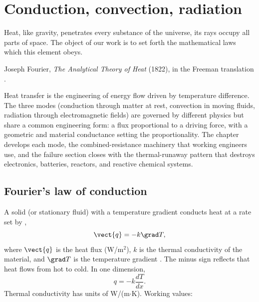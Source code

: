 \chapter{Conduction, convection, radiation}
\label{vol04:ch05}

\epigraph{Heat, like gravity, penetrates every substance of the
universe, its rays occupy all parts of space. The object of our work
is to set forth the mathematical laws which this element obeys.}{
Joseph Fourier, \emph{The Analytical Theory of Heat} (1822), in the
Freeman translation \cite[Preliminary Discourse, p.~1]{hist:fourier1822}.}


\noindent
Heat transfer is the engineering of energy flow driven by temperature
difference. The three modes (conduction through matter at rest,
convection in moving fluids, radiation through electromagnetic
fields) are governed by different physics but share a common
engineering form: a flux proportional to a driving force, with a
geometric and material conductance setting the proportionality. The
chapter develops each mode, the combined-resistance machinery that
working engineers use, and the failure section closes with the
thermal-runaway pattern that destroys electronics, batteries,
reactors, and reactive chemical systems.

\section{Fourier's law of conduction}

A solid (or stationary fluid) with a temperature gradient conducts
heat at a rate set by ,
\[
\vect{q} = -k \grad T,
\]
where $\vect{q}$ is the heat flux (W/m$^2$), $k$ is the thermal
conductivity of the material, and $\grad T$ is the temperature
gradient \cite{hist:fourier1822}. The minus sign reflects that heat
flows from hot to cold. In one dimension,
\[
q = -k \frac{dT}{dx}.
\]
Thermal conductivity has units of W/(m$\cdot$K). Working values:

